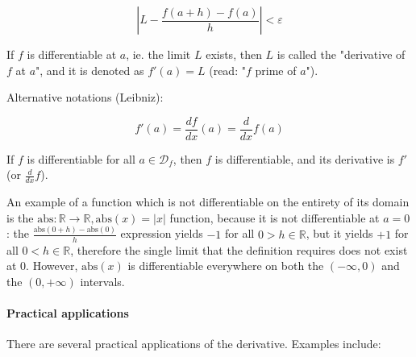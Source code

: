 \documentclass{article}
\begin{document}
          $$\left| L - \frac{f(a+h) - f(a)}{h} \right| < \varepsilon $$

          If $f$ is differentiable at $a$, ie. the limit $L$ exists, then $L$ is
          called the "derivative of $f$ at $a$", and it is denoted as
          $f'(a) = L$ (read: "$f$ prime of $a$").

          Alternative notations (Leibniz):

          $$f'(a) = \frac{df}{dx} (a) = \frac{d}{dx} f(a)$$

          If $f$ is differentiable for all $a \in \mathcal{D}_f$, then $f$ is
          differentiable, and its derivative is $f'$ (or $\frac{d}{dx} f$).

          An example of a function which is not differentiable on the entirety
          of its domain is the
          $\text{abs} : \mathbb{R} \rightarrow \mathbb{R}, \text{abs} (x) = |x|$
          function, because it is not differentiable at $a=0$: the
          $\frac{\text{abs}(0+h)-\text{abs}(0)}{h}$ expression yields $-1$ for
          all $0 > h \in \mathbb{R}$, but it yields $+1$ for all
          $0 < h \in \mathbb{R}$, therefore the single limit that the definition
          requires does not exist at $0$. However, $\text{abs}(x)$ is
          differentiable everywhere on both the $(-\infty, 0)$ and the $(0,
          +\infty)$ intervals.

          \paragraph{Practical applications}

            There are several practical applications of the derivative. Examples
            include:
\end{document}
